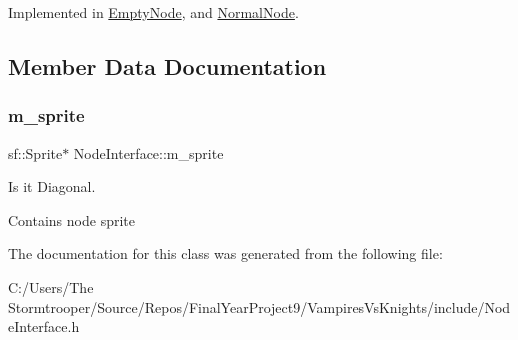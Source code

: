 Implemented in \mbox{\hyperlink{class_empty_node_ae11626adf3ad771cfcc68599c67ff354}{Empty\+Node}}, and \mbox{\hyperlink{class_normal_node_a4a846f6117353fe7483e1348a4da6e1f}{Normal\+Node}}.



\subsection{Member Data Documentation}
\mbox{\label{class_node_interface_a11c603f391c23f2ea6c7ff228f8f40e6}} 
\subsubsection{\texorpdfstring{m\+\_\+sprite}{m\_sprite}}
{\footnotesize\ttfamily sf\+::\+Sprite$\ast$ Node\+Interface\+::m\+\_\+sprite\hspace{0.3cm}{\ttfamily [protected]}}



Is it Diagonal. 

Contains node sprite 

The documentation for this class was generated from the following file\+:\begin{DoxyCompactItemize}
\item 
C\+:/\+Users/\+The Stormtrooper/\+Source/\+Repos/\+Final\+Year\+Project9/\+Vampires\+Vs\+Knights/include/Node\+Interface.\+h\end{DoxyCompactItemize}
